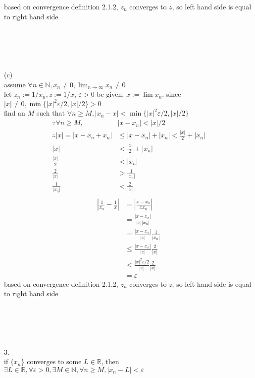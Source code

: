 \documentclass[12pt, border = 4pt, multi]{article} %
\begin{document}
based on convergence definition 2.1.2, $z_n$ converges to $z$, so left hand side is equal to right hand side\\
\\
\\
\\
\\
\\
(c)\\
assume $\forall n \in \mathbb{N}, x_n \not= 0, \lim_{n \rightarrow \infty} x_n \not= 0$\\
let $z_n := 1 / x_n, z := 1 / x$, $\varepsilon > 0$ be given, $x := \lim x_n$. since $|x| \not= 0, \min\{|x| ^ 2 \varepsilon / 2, |x| / 2\} > 0$\\
find an $M$ such that $\forall n \geq M, |x_n - x| < \min\{|x| ^ 2 \varepsilon / 2, |x| / 2\}$
\begin{align*}
\because \forall n \geq M, &|x - x_n| < |x| / 2\\
\therefore |x| = |x - x_n + x_n| &\leq |x - x_n| + |x_n| < \frac{|x|}{2} + |x_n|\\
|x| &< \frac{|x|}{2} + |x_n|\\
\frac{|x|}{2} &< |x_n|\\
\frac{2}{|x|} &> \frac{1}{|x_n|}\\
\frac{1}{|x_n|} &< \frac{2}{|x|}\\
\end{align*}
\begin{align*}
\left|\frac{1}{x_n} - \frac{1}{x}\right| &= \left|\frac{x - x_n}{xx_n}\right|\\
&= \frac{|x - x_n|}{|x||x_n|}\\
&= \frac{|x - x_n|}{|x|}\frac{1}{|x_n|}\\
&\leq \frac{|x - x_n|}{|x|}\frac{2}{|x|}\\
&< \frac{|x| ^ 2 \varepsilon / 2}{|x|}\frac{2}{|x|}\\
&= \varepsilon\end{align*}
based on convergence definition 2.1.2, $z_n$ converges to $z$, so left hand side is equal to right hand side\\
\\
\\
\\
\\
\\
3.\\
if $\{x_n\}$ converges to some $L \in \mathbb{R}$, then $\exists L \in \mathbb{R}, \forall \varepsilon > 0, \exists M \in \mathbb{N}, \forall n \geq M, |x_n - L| < \varepsilon$\\
\end{document}
